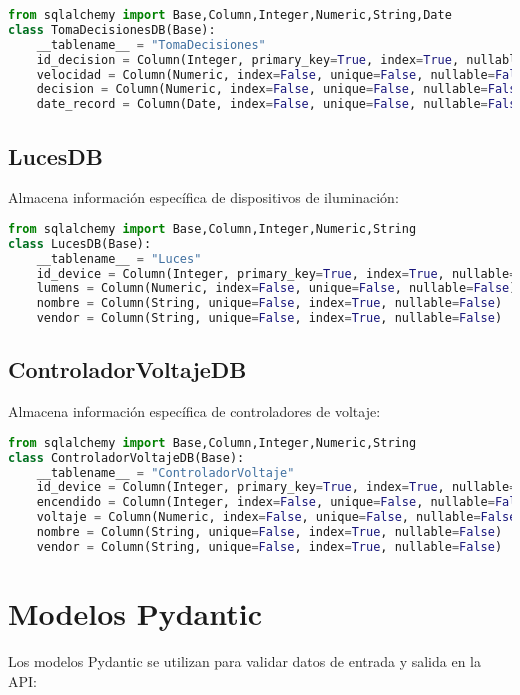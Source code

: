 \documentclass[12pt,letterpaper]{report}
\begin{document}
\begin{lstlisting}[language=python]
    from sqlalchemy import Base,Column,Integer,Numeric,String,Date
class TomaDecisionesDB(Base):
    __tablename__ = "TomaDecisiones"
    id_decision = Column(Integer, primary_key=True, index=True, nullable=False, unique=True, autoincrement=True)
    velocidad = Column(Numeric, index=False, unique=False, nullable=False)
    decision = Column(Numeric, index=False, unique=False, nullable=False)
    date_record = Column(Date, index=False, unique=False, nullable=False)
\end{lstlisting}

\subsection{LucesDB}
Almacena información específica de dispositivos de iluminación:

\begin{lstlisting}[language=python]
    from sqlalchemy import Base,Column,Integer,Numeric,String
class LucesDB(Base):
    __tablename__ = "Luces"
    id_device = Column(Integer, primary_key=True, index=True, nullable=False, unique=True, autoincrement=True)
    lumens = Column(Numeric, index=False, unique=False, nullable=False)
    nombre = Column(String, unique=False, index=True, nullable=False)
    vendor = Column(String, unique=False, index=True, nullable=False)
\end{lstlisting}

\subsection{ControladorVoltajeDB}
Almacena información específica de controladores de voltaje:

\begin{lstlisting}[language=python]
    from sqlalchemy import Base,Column,Integer,Numeric,String
class ControladorVoltajeDB(Base):
    __tablename__ = "ControladorVoltaje"
    id_device = Column(Integer, primary_key=True, index=True, nullable=False, unique=True, autoincrement=True)
    encendido = Column(Integer, index=False, unique=False, nullable=False)  # Usa Integer para booleano
    voltaje = Column(Numeric, index=False, unique=False, nullable=False)
    nombre = Column(String, unique=False, index=True, nullable=False)
    vendor = Column(String, unique=False, index=True, nullable=False)
\end{lstlisting}

\section{Modelos Pydantic}
Los modelos Pydantic se utilizan para validar datos de entrada y salida en la API:
\end{document}
